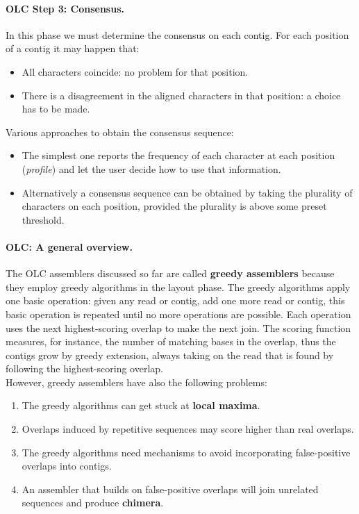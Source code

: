 \paragraph*{OLC Step 3: Consensus.} In this phase we must determine the consensus on each contig. For each position of a contig it may happen that:
\begin{itemize}
	\item All characters coincide: no problem for that position.
	\item There is a disagreement in the aligned characters in that position: a choice has to be made.
\end{itemize}
Various approaches to obtain the consensus sequence:
\begin{itemize}
	\item The simplest one reports the frequency of each character at each position (\textit{profile}) and let the user decide how to use that information.
	\item Alternatively a consensus sequence can be obtained by taking the plurality of characters on each position, provided the plurality is above some preset threshold.
\end{itemize}

\paragraph*{OLC: A general overview.} The OLC assemblers discussed so far are called \textbf{greedy assemblers} because they employ greedy algorithms in the layout phase. The greedy algorithms apply one basic operation: given any read or contig, add one more read or contig, this basic operation is repeated until no more operations are possible. Each operation uses the next highest-scoring overlap to make the next join. The scoring function measures, for instance, the number of matching bases in the overlap, thus the contigs grow by greedy extension, always taking on the read that is found by following the highest-scoring overlap.\\
However, greedy assemblers have also the following problems:
\begin{enumerate}
	\item The greedy algorithms can get stuck at \textbf{local maxima}.
	\item Overlaps induced by repetitive sequences may score higher than real overlaps.
	\item The greedy algorithms need mechanisms to avoid incorporating false-positive overlaps into contigs.
	\item An assembler that builds on false-positive overlaps will join unrelated sequences and produce \textbf{chimera}.
\end{enumerate}


